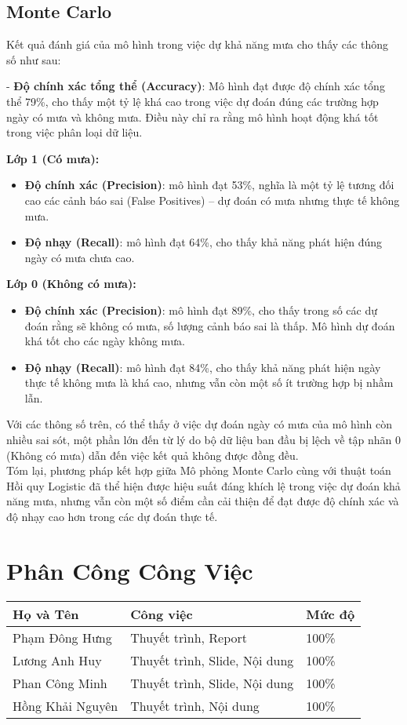 \documentclass[conference]{IEEEtran}
\begin{document}
\subsection {Monte Carlo}
\noindent Kết quả đánh giá của mô hình trong việc dự khả năng mưa cho thấy các thông số như sau:

- \textbf{Độ chính xác tổng thể (Accuracy)}: Mô hình đạt được độ chính xác tổng thể 79\%, cho thấy một tỷ lệ khá cao trong việc dự đoán đúng các trường hợp ngày có mưa và không mưa. Điều này chỉ ra rằng mô hình hoạt động khá tốt trong việc phân loại dữ liệu.

\noindent \textbf{Lớp 1 (Có mưa):}
\begin{itemize}
   \item \textbf{Độ chính xác (Precision)}: mô hình đạt 53\%, nghĩa là một tỷ lệ tương đối cao các cảnh báo sai (False Positives) – dự đoán có mưa nhưng thực tế không mưa.

    \item \textbf{Độ nhạy (Recall)}: mô hình đạt 64\%, cho thấy khả năng phát hiện đúng ngày có mưa chưa cao.
\end{itemize}
\noindent \textbf{Lớp 0 (Không có mưa):}
\begin{itemize}
    \item\textbf{Độ chính xác (Precision)}: mô hình đạt 89\%, cho thấy trong số các dự đoán rằng sẽ không có mưa, số lượng cảnh báo sai là thấp. Mô hình dự đoán khá tốt cho các ngày không mưa.
    \item\textbf{Độ nhạy (Recall)}: mô hình đạt 84\%, cho thấy khả năng phát hiện ngày thực tế không mưa là khá cao, nhưng vẫn còn một số ít trường hợp bị nhầm lẫn.
\end{itemize}

Với các thông số trên, có thể thấy ở việc dự đoán ngày có mưa của mô hình còn nhiều sai sót, một phần lớn đến từ lý do bộ dữ liệu ban đầu bị lệch về tập nhãn 0 (Không có mưa) dẫn đến việc kết quả không được đồng đều.
\\
\indent Tóm lại, phương pháp kết hợp giữa Mô phỏng Monte Carlo cùng với thuật toán Hồi quy Logistic đã thể hiện được hiệu suất đáng khích lệ trong việc dự đoán khả năng mưa, nhưng vẫn còn một số điểm cần cải thiện để đạt được độ chính xác và độ nhạy cao hơn trong các dự đoán thực tế.
\section{Phân Công Công Việc}
\begin{tabular}{lll}
    \toprule
    Họ và Tên & Công việc & Mức độ \\
    \midrule
    Phạm Đông Hưng & Thuyết trình, Report & 100\% \\
    Lương Anh Huy & Thuyết trình, Slide, Nội dung & 100\% \\
    Phan Công Minh & Thuyết trình, Slide, Nội dung & 100\% \\
    Hồng Khải Nguyên & Thuyết trình, Nội dung & 100\% \\
    \bottomrule 
\end{tabular}
\end{document}
